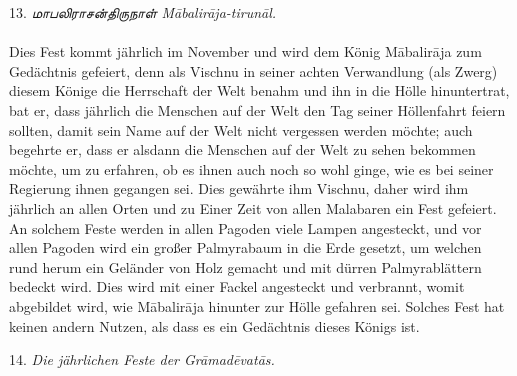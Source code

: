\documentclass{article}
\newcommand{\TamilText}[1]{\texttamil{#1}}
\newcommand{\tam}[1]{\TamilText{#1}}
\begin{document}
\begin{center}
13. \emph{\tam{மாபலிராசன்திருநாள்} M\={a}balir\={a}ja-tirun\={a}l.}
\end{center}
\paragraph{}
Dies Fest kommt jährlich im November und wird dem König M\={a}balir\={a}ja zum Gedächtnis gefeiert, denn als Vischnu in seiner achten Verwandlung (als Zwerg) diesem Könige die Herrschaft der Welt benahm und ihn in die Hölle hinuntertrat, bat er, dass jährlich die Menschen auf der Welt den Tag seiner Höllenfahrt feiern sollten, damit sein Name auf der Welt nicht vergessen werden möchte; auch begehrte er, dass er alsdann die Menschen auf der Welt zu sehen bekommen möchte, um zu erfahren, ob es ihnen auch noch so wohl ginge, wie es bei seiner Regierung ihnen gegangen sei. Dies gewährte ihm Vischnu, daher wird ihm jährlich an allen Orten und zu Einer Zeit von allen Malabaren ein Fest gefeiert. An solchem Feste werden in allen Pagoden viele Lampen angesteckt, und vor allen Pagoden wird ein großer Palmyrabaum in die Erde gesetzt, um welchen rund herum ein Geländer von Holz gemacht und mit dürren Palmyrablättern bedeckt wird. Dies wird mit einer Fackel angesteckt und verbrannt, womit abgebildet wird, wie M\={a}balir\={a}ja hinunter zur Hölle gefahren sei. Solches Fest hat keinen andern Nutzen, als dass es ein Gedächtnis dieses Königs ist.

\begin{center}
14. \emph{Die jährlichen Feste der Gr\={a}mad\={e}vat\={a}s.}
\end{center}
\end{document}
